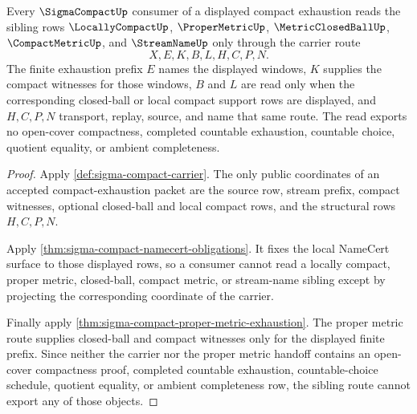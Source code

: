 \begin{theorem}\label{thm:sigma-compact-compact-exhaustion-sibling-route}
Every $\SigmaCompactUp$ consumer of a displayed compact exhaustion reads the sibling rows $\LocallyCompactUp$, $\ProperMetricUp$, $\MetricClosedBallUp$, $\CompactMetricUp$, and $\StreamNameUp$ only through the carrier route
$$
X,E,K,B,L,H,C,P,N .
$$
The finite exhaustion prefix $E$ names the displayed windows, $K$ supplies the compact witnesses for those windows, $B$ and $L$ are read only when the corresponding closed-ball or local compact support rows are displayed, and $H,C,P,N$ transport, replay, source, and name that same route. The read exports no open-cover compactness, completed countable exhaustion, countable choice, quotient equality, or ambient completeness.
\end{theorem}
\begin{proof}
Apply \autoref{def:sigma-compact-carrier}. The only public coordinates of an accepted compact-exhaustion packet are the source row, stream prefix, compact witnesses, optional closed-ball and local compact rows, and the structural rows $H,C,P,N$.

Apply \autoref{thm:sigma-compact-namecert-obligations}. It fixes the local NameCert surface to those displayed rows, so a consumer cannot read a locally compact, proper metric, closed-ball, compact metric, or stream-name sibling except by projecting the corresponding coordinate of the carrier.

Finally apply \autoref{thm:sigma-compact-proper-metric-exhaustion}. The proper metric route supplies closed-ball and compact witnesses only for the displayed finite prefix. Since neither the carrier nor the proper metric handoff contains an open-cover compactness proof, completed countable exhaustion, countable-choice schedule, quotient equality, or ambient completeness row, the sibling route cannot export any of those objects.
\end{proof}


